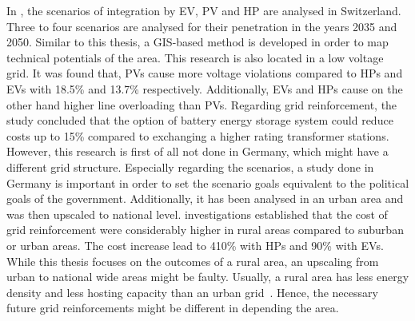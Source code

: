 In \cite{GUPTA2021116504}, the scenarios of integration by EV, PV and HP are analysed in Switzerland. Three to four scenarios are analysed for their penetration in the years 2035 and 2050. Similar to this thesis, a GIS-based method is developed in order to map technical potentials of the area. This research is also located in a low voltage grid. It was found that, PVs cause more voltage violations compared to HPs and EVs with 18.5\% and 13.7\% respectively. Additionally, EVs and HPs cause on the other hand higher line overloading than PVs. Regarding grid reinforcement, the study concluded that the option of battery energy storage system could reduce costs up to 15\% compared to exchanging a higher rating transformer stations. However, this research is first of all not done in Germany, which might have a different grid structure. Especially regarding the scenarios, a study done in Germany is important in order to set the scenario goals equivalent to the political goals of the government. Additionally, it has been analysed in an urban area and was then upscaled to national level. investigations established that the cost of grid reinforcement were considerably higher in rural areas compared to suburban or urban areas. The cost increase lead to 410\% with HPs and 90\% with EVs. While this thesis focuses on the outcomes of a rural area, an upscaling from urban to national wide areas might be faulty. Usually, a rural area has less energy density and less hosting capacity than an urban grid~\cite{ior}. Hence, the necessary future grid reinforcements might be different in depending the area. 


